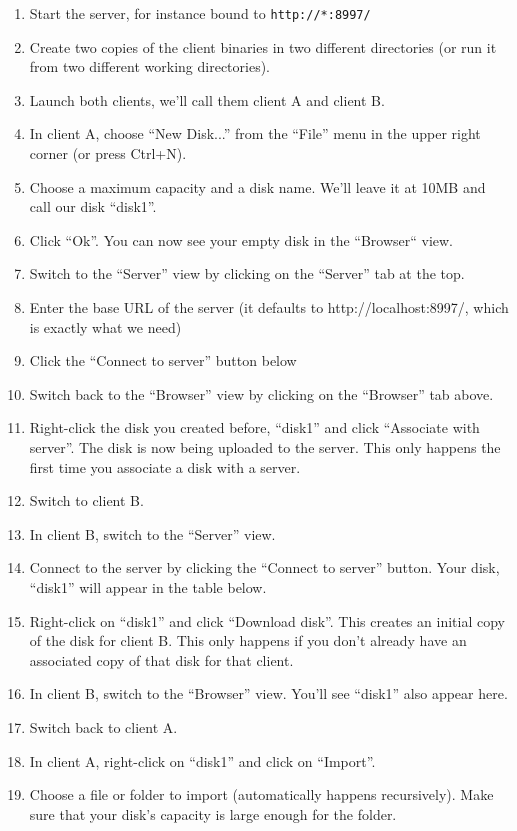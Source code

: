 \documentclass[a4paper,12pt]{article}
\begin{document}
\begin{enumerate}
\item Start the server, for instance bound to \lstinline[language=bash]!http://*:8997/!
\item Create two copies of the client binaries in two different directories (or run it from two different working directories).
\item Launch both clients, we'll call them client A and client B.
\item In client A, choose ``New Disk...'' from the ``File'' menu in the upper right corner (or press Ctrl+N).
\item Choose a maximum capacity and a disk name. We'll leave it at 10MB and call our disk ``disk1''.
\item Click ``Ok''. You can now see your empty disk in the ``Browser`` view.
\item Switch to the ``Server'' view by clicking on the ``Server'' tab at the top.
\item Enter the base URL of the server (it defaults to http://localhost:8997/, which is exactly what we need)
\item Click the ``Connect to server'' button below
\item Switch back to the ``Browser'' view by clicking on the ``Browser'' tab above.
\item Right-click the disk you created before, ``disk1'' and click ``Associate with server''. The disk is now being uploaded to the server. This only happens the first time you associate a disk with a server.
\item Switch to client B.
\item In client B, switch to the ``Server'' view.
\item Connect to the server by clicking the ``Connect to server'' button. Your disk, ``disk1'' will appear in the table below.
\item Right-click on ``disk1'' and click ``Download disk''. This creates an initial copy of the disk for client B. This only happens if you don't already have an associated copy of that disk for that client. 
\item In client B, switch to the ``Browser'' view. You'll see ``disk1'' also appear here.
\item Switch back to client A.
\item In client A, right-click on ``disk1'' and click on ``Import''.
\item Choose a file or folder to import (automatically happens recursively). Make sure that your disk's capacity is large enough for the folder.

\end{enumerate}
\end{document}
